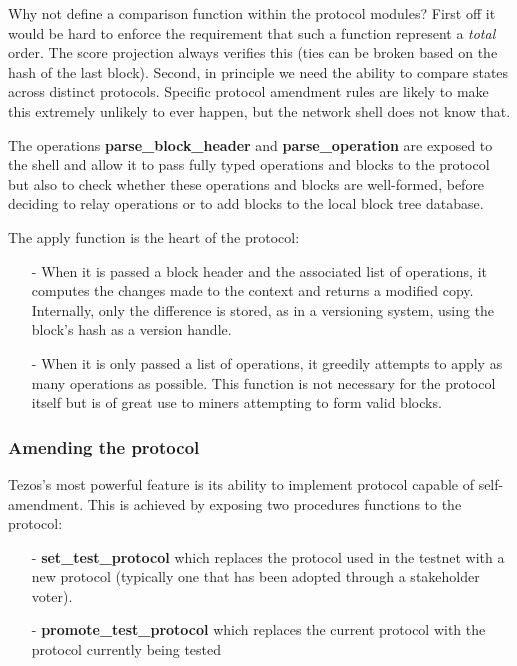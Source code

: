 \documentclass[letterpaper]{article}
\begin{document}
Why not define a comparison function within the protocol modules? First off it
would be hard to enforce the requirement that such a function represent a
\emph{total} order. The score projection always verifies this (ties can be
broken based on the hash of the last block). Second, in principle we need 
the ability to compare states across distinct protocols. Specific protocol
amendment rules are likely to make this extremely unlikely to ever happen,
but the network shell does not know that.

The operations \textbf{parse\_block\_header} and \textbf{parse\_operation} are
exposed to the  shell and allow it to pass fully typed operations and blocks to
the protocol but also to check whether these operations and blocks are
well-formed, before deciding to relay operations or to add blocks to the local
block tree database.

The apply function is the heart of the protocol:
\begin{itemize}
\item[-]When it is passed a block header and the associated list of operations,
it computes the changes made to the context and returns a modified copy.
Internally, only the difference is stored, as in a versioning system,
using the block's hash as a version handle.
\item[-]When it is only passed a list of operations, it greedily attempts
to apply as many operations as possible. This function is not necessary for the
protocol itself but is of great use to miners attempting to form valid blocks.
\end{itemize}

\subsubsection{Amending the protocol}

Tezos's most powerful feature is its ability to implement protocol capable
of self-amendment. This is achieved by exposing two procedures functions to the
protocol:

\begin{itemize}
\item[-] \textbf{set\_test\_protocol} which replaces the protocol
used in the testnet with a new protocol (typically one that has been adopted
through a stakeholder voter).
\item[-] \textbf{promote\_test\_protocol} which replaces the current
protocol with the protocol currently being tested
\end{itemize}
\end{document}
